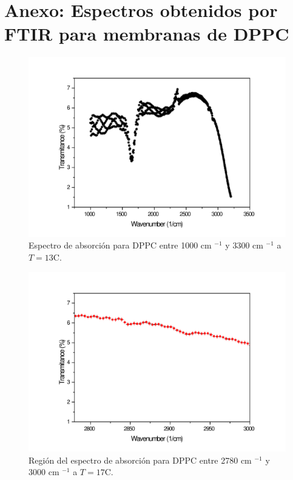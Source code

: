 \documentclass[%
 reprint,
 amsmath,amssymb,
 aps,
]{revtex4-2}
\begin{document}
\section*{Anexo: Espectros obtenidos por FTIR para membranas de DPPC}
\begin{figure}[ht]
\includegraphics[scale=0.2]{FTIR/Graph1.pdf}
  \caption{Espectro de absorci\'{o}n para DPPC entre 1000 cm $^{-1}$ y 3300 cm $^{-1}$ a $T=13$\textdegree C.}
  \label{fig:13}
\end{figure}
\begin{figure}[ht]
\includegraphics[scale=0.25]{FTIR/17C.pdf}
  \caption{Regi\'{o}n del espectro de absorci\'{o}n para DPPC entre 2780 cm $^{-1}$ y 3000 cm $^{-1}$ a $T=17$\textdegree C.}
  \label{fig:espa17}
\end{figure}
\end{document}
